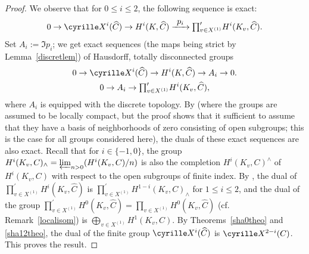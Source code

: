 \documentclass[10pt,a4paper]{amsart}
\newcommand{\cf}{cf.\xspace}
\newcommand\To[1]{\mathchoice{\xrightarrow{\textstyle\kern4pt#1\kern3pt}}{\stackrel{#1}{\longrightarrow}}{}{}}
\newcommand{\tprod}{{\textstyle\prod}}
\theoremstyle{plain}
\theoremstyle{definition}
\newcommand\Sha{\cyrille X}
\begin{document}
\begin{proof}
We observe that for $0 \leq i \leq 2$, the following
sequence is exact:\vspace*{-3pt}
\[
0 \to \Sha^i(\widehat C) \to H^i(K,\widehat C) \To{p_i}
\tprod^{\prime}_{v \in X^{(1)}} H^i(K_v,\widehat C).
\]
Set $A_i:=\Im p_i$; we get exact sequences
(the maps being strict by Lemma~\ref{discretlem}) of
Hausdorff, totally disconnected groups
\begin{gather*}
0 \to \Sha^i(\widehat C) \to H^i(K,\widehat C) \to A_i \to 0.
\\
0 \to A_i \to \tprod^{\prime}_{v \in X^{(1)}} H^i(K_v,\widehat C),
\end{gather*}
where $A_i$ is equipped with the discrete topology. By \cite[Lem.\,2.4]{hss} (where the groups are assumed to be locally compact, but the proof shows
that it sufficient to assume
that they have a basis of neighborhoods of zero consisting
of open subgroups; this is the case for all groups considered here),
the duals of these exact sequences are also exact.
Recall that for $i \in \{-1, 0\}$, the group
$H^i(K_v,C)_{\wedge}=\varprojlim_{n >0} (H^i(K_v,C)/n)$ is also the
completion $H^i(K_v,C)^{\wedge}$ of $H^i(K_v,C)$ with respect to the
open subgroups of finite index.
By \cite[Th.\,3.1 \& 3.3]{demphd}, the dual of
$\prod^{\prime}_{v \in X^{(1)}} H^i(K_v,\widehat C)$ is
$\prod^{\prime}_{v \in X^{(1)}} H^{1-i}(K_v,C)_{\wedge}$
for $1 \leq i \leq 2$, and
the dual of the group
$\prod^{\prime}_{v \in X^{(1)}} H^0(K_v,\widehat C)=\tprod_{v \in X^{(1)}}
H^0(K_v,\widehat C)$ (\cf Remark~\ref{localisom}) is $\bigoplus_{v \in X^{(1)}}
H^1(K_v,C)$. By Theorems~\ref{sha0theo} and \ref{sha12theo},
the dual of the finite group $\Sha^i(\widehat C)$ is
$\Sha^{2-i}(C)$. This proves the result.
\end{proof}
\end{document}
